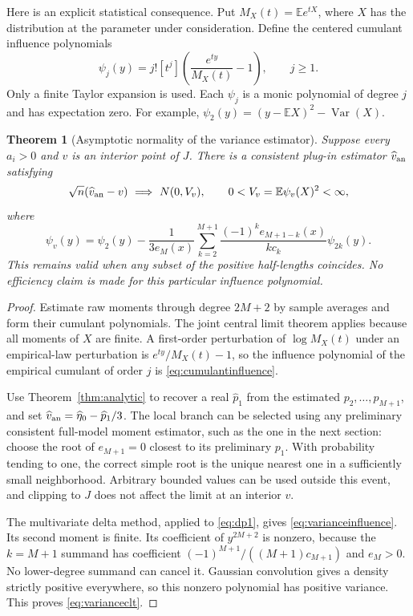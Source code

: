 \documentclass[11pt,a4paper]{article}
\numberwithin{equation}{section}
\newtheorem{theorem}{Theorem}[section]
\theoremstyle{definition}
\theoremstyle{remark}
\newcommand{\E}{\mathbb E}
\begin{document}
Here is an explicit statistical consequence. Put
$M_X(t)=\E e^{tX}$, where $X$ has the distribution at the parameter under
consideration. Define the centered cumulant influence polynomials
\begin{equation}
 \psi_j(y)=j![t^j]\left(\frac{e^{ty}}{M_X(t)}-1\right),\qquad j\ge1.
 \label{eq:cumulantinfluence}
\end{equation}
Only a finite Taylor expansion is used. Each $\psi_j$ is a monic polynomial
of degree $j$ and has expectation zero. For example,
$\psi_2(y)=(y-\E X)^2-\operatorname{Var}(X)$.

\begin{theorem}[Asymptotic normality of the variance estimator]
\label{thm:clt}
Suppose every $a_i>0$ and $v$ is an interior point of $J$. There is a
consistent plug-in estimator $\widehat v_{\rm an}$ satisfying
\begin{equation}
 \sqrt n(\widehat v_{\rm an}-v)\ \Longrightarrow\ N(0,V_v),\qquad
 0<V_v=\E\psi_v(X)^2<\infty,
 \label{eq:varianceclt}
\end{equation}
where
\begin{equation}
 \psi_v(y)=\psi_2(y)-\frac{1}{3e_M(x)}
   \sum_{k=2}^{M+1}\frac{(-1)^k e_{M+1-k}(x)}{k c_k}\psi_{2k}(y).
 \label{eq:varianceinfluence}
\end{equation}
This remains valid when any subset of the positive half-lengths coincides.
No efficiency claim is made for this particular influence polynomial.
\end{theorem}
\begin{proof}
Estimate raw moments through degree $2M+2$ by sample averages and form their
cumulant polynomials. The joint central limit theorem applies because all
moments of $X$ are finite. A first-order perturbation of $\log M_X(t)$ under
an empirical-law perturbation is $e^{ty}/M_X(t)-1$, so the influence polynomial
of the empirical cumulant of order $j$ is \eqref{eq:cumulantinfluence}.

Use Theorem~\ref{thm:analytic} to recover a real $\widehat p_1$ from the
estimated $p_2,\ldots,p_{M+1}$, and set
$\widehat v_{\rm an}=\widehat\eta_0-\widehat p_1/3$.
The local branch can be selected using any preliminary consistent full-model
moment estimator, such as the one in the next section: choose the root of
$e_{M+1}=0$ closest to its preliminary $p_1$. With probability tending to one,
the correct simple root is the unique nearest one in a sufficiently small
neighborhood. Arbitrary bounded values can be used outside this event, and
clipping to $J$ does not affect the limit at an interior $v$.

The multivariate delta method, applied to \eqref{eq:dp1}, gives
\eqref{eq:varianceinfluence}. Its second moment is finite. Its coefficient of
$y^{2M+2}$ is nonzero, because the $k=M+1$ summand has coefficient
$(-1)^{M+1}/((M+1)c_{M+1})$ and $e_M>0$.
No lower-degree summand can cancel it. Gaussian convolution gives a density
strictly positive everywhere, so this nonzero polynomial has positive
variance. This proves \eqref{eq:varianceclt}.
\end{proof}
\end{document}
